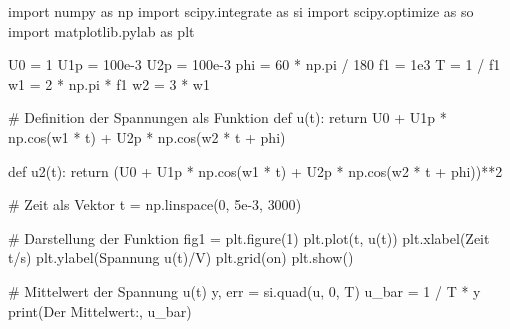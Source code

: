 \documentclass[
  ngerman,
  letterpaper,
]{scrbook}
\newenvironment{Shaded}{}{}
\newcommand{\BuiltInTok}[1]{\textcolor[rgb]{0.84,0.23,0.29}{#1}}
\newcommand{\CommentTok}[1]{\textcolor[rgb]{0.42,0.45,0.49}{#1}}
\newcommand{\ControlFlowTok}[1]{\textcolor[rgb]{0.84,0.23,0.29}{#1}}
\newcommand{\DecValTok}[1]{\textcolor[rgb]{0.00,0.36,0.77}{#1}}
\newcommand{\FloatTok}[1]{\textcolor[rgb]{0.00,0.36,0.77}{#1}}
\newcommand{\ImportTok}[1]{\textcolor[rgb]{0.01,0.18,0.38}{#1}}
\newcommand{\KeywordTok}[1]{\textcolor[rgb]{0.84,0.23,0.29}{#1}}
\newcommand{\NormalTok}[1]{\textcolor[rgb]{0.14,0.16,0.18}{#1}}
\newcommand{\OperatorTok}[1]{\textcolor[rgb]{0.14,0.16,0.18}{#1}}
\newcommand{\StringTok}[1]{\textcolor[rgb]{0.01,0.18,0.38}{#1}}
\begin{document}
\begin{Shaded}
\begin{Highlighting}[]
\ImportTok{import}\NormalTok{ numpy }\ImportTok{as}\NormalTok{ np}
\ImportTok{import}\NormalTok{ scipy.integrate }\ImportTok{as}\NormalTok{ si}
\ImportTok{import}\NormalTok{ scipy.optimize }\ImportTok{as}\NormalTok{ so}
\ImportTok{import}\NormalTok{ matplotlib.pylab }\ImportTok{as}\NormalTok{ plt}

\NormalTok{U0 }\OperatorTok{=} \DecValTok{1}
\NormalTok{U1p }\OperatorTok{=} \FloatTok{100e{-}3}
\NormalTok{U2p }\OperatorTok{=} \FloatTok{100e{-}3}
\NormalTok{phi }\OperatorTok{=} \DecValTok{60} \OperatorTok{*}\NormalTok{ np.pi }\OperatorTok{/} \DecValTok{180}
\NormalTok{f1 }\OperatorTok{=} \FloatTok{1e3}
\NormalTok{T }\OperatorTok{=} \DecValTok{1} \OperatorTok{/}\NormalTok{ f1}
\NormalTok{w1 }\OperatorTok{=} \DecValTok{2} \OperatorTok{*}\NormalTok{ np.pi }\OperatorTok{*}\NormalTok{ f1}
\NormalTok{w2 }\OperatorTok{=} \DecValTok{3} \OperatorTok{*}\NormalTok{ w1}


\CommentTok{\# Definition der Spannungen als Funktion}
\KeywordTok{def}\NormalTok{ u(t):}
    \ControlFlowTok{return}\NormalTok{ U0 }\OperatorTok{+}\NormalTok{ U1p }\OperatorTok{*}\NormalTok{ np.cos(w1 }\OperatorTok{*}\NormalTok{ t) }\OperatorTok{+}\NormalTok{ U2p }\OperatorTok{*}\NormalTok{ np.cos(w2 }\OperatorTok{*}\NormalTok{ t }\OperatorTok{+}\NormalTok{ phi)}


\KeywordTok{def}\NormalTok{ u2(t):}
    \ControlFlowTok{return}\NormalTok{ (U0 }\OperatorTok{+}\NormalTok{ U1p }\OperatorTok{*}\NormalTok{ np.cos(w1 }\OperatorTok{*}\NormalTok{ t) }\OperatorTok{+}\NormalTok{ U2p }\OperatorTok{*}\NormalTok{ np.cos(w2 }\OperatorTok{*}\NormalTok{ t }\OperatorTok{+}\NormalTok{ phi))}\OperatorTok{**}\DecValTok{2}


\CommentTok{\# Zeit als Vektor}
\NormalTok{t }\OperatorTok{=}\NormalTok{ np.linspace(}\DecValTok{0}\NormalTok{, }\FloatTok{5e{-}3}\NormalTok{, }\DecValTok{3000}\NormalTok{)}

\CommentTok{\# Darstellung der Funktion}
\NormalTok{fig1 }\OperatorTok{=}\NormalTok{ plt.figure(}\DecValTok{1}\NormalTok{)}
\NormalTok{plt.plot(t, u(t))}
\NormalTok{plt.xlabel(}\StringTok{\textquotesingle{}Zeit t/s\textquotesingle{}}\NormalTok{)}
\NormalTok{plt.ylabel(}\StringTok{\textquotesingle{}Spannung u(t)/V\textquotesingle{}}\NormalTok{)}
\NormalTok{plt.grid(}\StringTok{\textquotesingle{}on\textquotesingle{}}\NormalTok{)}
\NormalTok{plt.show()}

\CommentTok{\# Mittelwert der Spannung u(t)}
\NormalTok{y, err }\OperatorTok{=}\NormalTok{ si.quad(u, }\DecValTok{0}\NormalTok{, T)}
\NormalTok{u\_bar }\OperatorTok{=} \DecValTok{1} \OperatorTok{/}\NormalTok{ T }\OperatorTok{*}\NormalTok{ y}
\BuiltInTok{print}\NormalTok{(}\StringTok{\textquotesingle{}Der Mittelwert:\textquotesingle{}}\NormalTok{, u\_bar)}


\end{Highlighting}
\end{Shaded}
\end{document}
